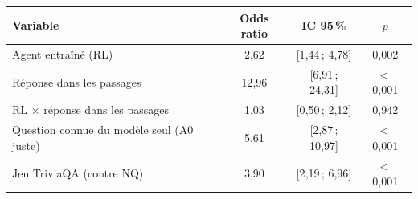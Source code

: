 \begin{tabular}{@{}lccc@{}}
\toprule
Variable & Odds ratio & IC 95\,\% & $p$\\
\midrule
Agent entraîné (RL) & 2{,}62 & [1{,}44\,; 4{,}78] & 0{,}002\\
Réponse dans les passages & 12{,}96 & [6{,}91\,; 24{,}31] & $<$\,0{,}001\\
RL $\times$ réponse dans les passages & 1{,}03 & [0{,}50\,; 2{,}12] & 0{,}942\\
Question connue du modèle seul (A0 juste) & 5{,}61 & [2{,}87\,; 10{,}97] & $<$\,0{,}001\\
Jeu TriviaQA (contre NQ) & 3{,}90 & [2{,}19\,; 6{,}96] & $<$\,0{,}001\\
\bottomrule
\end{tabular}
